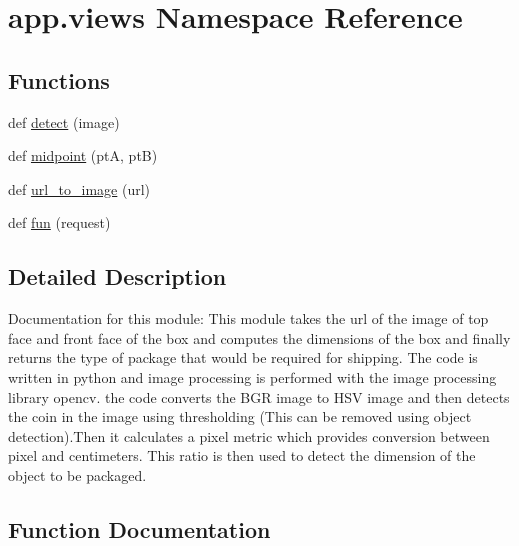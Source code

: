 \hypertarget{namespaceapp_1_1views}{}\section{app.\+views Namespace Reference}
\label{namespaceapp_1_1views}
\subsection*{Functions}
\begin{DoxyCompactItemize}
\item 
def \hyperlink{namespaceapp_1_1views_aa2a5b891080c2d264074dbeb3d62a811}{detect} (image)
\item 
def \hyperlink{namespaceapp_1_1views_a0b522eae4299db3dad2d12ea2c2ca990}{midpoint} (ptA, ptB)
\item 
def \hyperlink{namespaceapp_1_1views_a3972d50362fcf36689652962e5e49667}{url\+\_\+to\+\_\+image} (url)
\item 
def \hyperlink{namespaceapp_1_1views_ae9336c0d231671831f86c4d9a43bb32d}{fun} (request)
\end{DoxyCompactItemize}


\subsection{Detailed Description}
\begin{DoxyVerb}Documentation for this module:
This module takes the url of the image of top face and front face of the box and computes the 
dimensions of the box and finally returns the type of package that would be required for shipping.
The code is written in python and image processing is performed with the image processing library opencv.
the code converts the BGR image to HSV image and then detects the coin in the image using thresholding
(This can be removed using object detection).Then it calculates a pixel metric which provides conversion between
pixel and centimeters.  This ratio is then used to detect the dimension of the object
to be packaged.
\end{DoxyVerb}
 

\subsection{Function Documentation}
\mbox{\label{namespaceapp_1_1views_aa2a5b891080c2d264074dbeb3d62a811}} 

